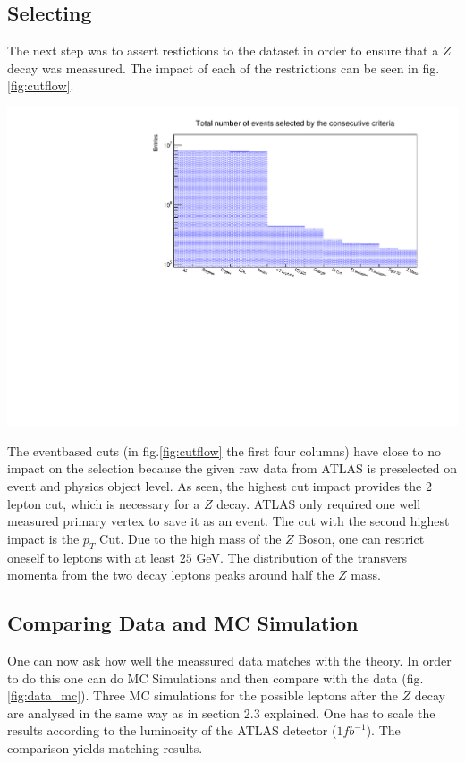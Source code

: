 \documentclass[12pt, a4paper, bibliography=totoc]{scrartcl}
\begin{document}
\begin{multicols}{2}
\subsection{Selecting} 
The next step was to assert restictions to the dataset in order to ensure that a $Z$ decay was meassured.
The impact of each of the restrictions can be seen in fig.\ref{fig:cutflow}. 
\begin{center}
	\includegraphics[width=\linewidth]{fig/cutflow.pdf}
	\label{fig:cutflow}
\end{center}
The eventbased cuts (in fig.\ref{fig:cutflow} the first four columns) have close to no impact on the selection because the given raw data from ATLAS is preselected on event and physics object level.
As seen, the highest cut impact provides the 2 lepton cut, which  is necessary for a $Z$ decay. ATLAS only required one well measured primary vertex to save it as an event.
The cut with the second highest impact is the $p_{T}$ Cut. Due to the high mass of the $Z$ Boson, one can restrict oneself to leptons with at least $25$ GeV. The distribution of the transvers momenta from the two decay leptons peaks around half the $Z$ mass. 


\subsection{Comparing Data and MC Simulation}
One can now ask how well the meassured data matches with the theory. 
In order to do this one can do MC Simulations and then compare with the data (fig. \ref{fig:data_mc}). Three MC simulations for the possible leptons after the $Z$ decay are analysed in the same way as in section 2.3 explained. One has to scale the results according to the luminosity of the ATLAS detector ($1 fb^{-1}$).
The comparison yields matching results.


\end{multicols}
\end{document}
